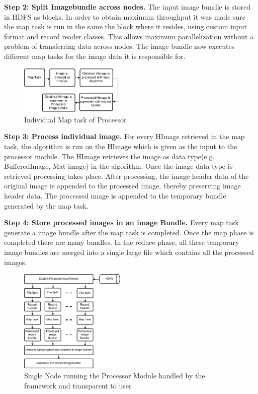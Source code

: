 \documentclass[conference]{IEEEtran}
\begin{document}
\textbf{Step 2: Split Imagebundle across nodes.} The input image bundle is stored in HDFS as blocks. In order to obtain maximum throughput it was made sure the map task is run in the same the block where it resides, using custom input format and record reader classes. This allows maximum parallelization without a problem of transferring data across nodes. The image bundle now executes different map tasks for the image data it is responsible for.

\begin{figure}[h]
	\centering
	\includegraphics[width=0.45\textwidth]{pro-map}
	\caption{Individual Map task of Processor}
	\label{fig:pro-map}
\end{figure}

\textbf{Step 3: Process individual image.} For every HImage retrieved in the map task, the algorithm is run on the HImage which is given as the input to the processor module. The HImage retrieves the image as data type(e.g. BufferedImage, Mat image) in the algorithm. Once the image data type is retrieved processing takes place. After processing, the image header data of the original image is appended to the processed image, thereby preserving image header data. The processed image is appended to the temporary bundle generated by the map task.

\textbf{Step 4: Store processed images in an image Bundle.} Every map task generate a image bundle after the map task is completed. Once the map phase is completed there are many bundles. In the reduce phase, all these temporary image bundles are merged into a single large file which contains all the processed images.

\begin{figure}[h]
	\centering
	\includegraphics[width=0.45\textwidth]{pro-node}
	\caption{Single Node running the Processor Module handled by the framework and transparent to user}
	\label{fig:pro-node}
\end{figure}
\end{document}

